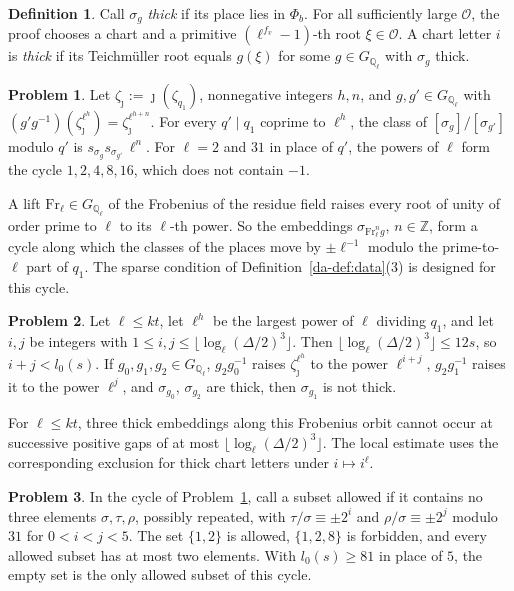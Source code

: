 \documentclass[reqno]{amsart}
\theoremstyle{definition}
\newtheorem{problem}{Problem}[section]
\newtheorem{definition}{Definition}[section]
\theoremstyle{plain}
\newcommand{\Z}{\mathbb{Z}}
\newcommand{\Q}{\mathbb{Q}}
\newcommand{\Oc}{\mathcal{O}}
\newcommand{\Gl}{G_{\Q_\ell}}
\newcommand{\half}{(\Delta/2)}
\begin{document}
\begin{definition}\label{def:thick}
Call \(\sigma_g\) \emph{thick} if its place lies in \(\Phi_b\).  For all sufficiently large \(\Oc\), the proof chooses a chart and a primitive \((\ell^{f_v}-1)\)-th root \(\xi\in\Oc\).  A chart letter \(i\) is \emph{thick} if its Teichmüller root equals \(g(\xi)\) for some \(g\in\Gl\) with \(\sigma_g\) thick.
\end{definition}

\begin{problem}\label{pr:cycle}
Let \(\zeta_\jmath := \jmath(\zeta_{q_1})\), nonnegative integers \(h,n\), and \(g, g' \in \Gl\) with \((g'g^{-1})(\zeta_\jmath^{\ell^h}) = \zeta_\jmath^{\ell^{h+n}}\).  For every \(q' \mid q_1\) coprime to \(\ell^h\), the class of \([\sigma_g]/[\sigma_{g'}]\) modulo \(q'\) is \(s_{\sigma_g}s_{\sigma_{g'}}\,\ell^n\).  For \(\ell = 2\) and \(31\) in place of \(q'\), the powers of \(\ell\) form the cycle \(1, 2, 4, 8, 16\), which does not contain \(-1\).
\end{problem}

A lift \(\mathrm{Fr}_\ell \in \Gl\) of the Frobenius of the residue field raises every root of unity of order prime to \(\ell\) to its \(\ell\)-th power.  So the embeddings \(\sigma_{\mathrm{Fr}_\ell^ng}\), \(n \in \Z\), form a cycle along which the classes of the places move by \(\pm\ell^{-1}\) modulo the prime-to-\(\ell\) part of \(q_1\).  The sparse condition of Definition~\ref{da-def:data}(3) is designed for this cycle.

\begin{problem}\label{pr:sparse-window}
Let \(\ell \le kt\), let \(\ell^h\) be the largest power of \(\ell\) dividing \(q_1\), and let \(i,j\) be integers with \(1 \le i, j \le \lfloor \log_\ell \half^3\rfloor\).  Then \(\lfloor\log_\ell\half^3\rfloor \le 12s\), so \(i + j < l_0(s)\).  If \(g_0, g_1, g_2 \in \Gl\), \(g_2g_0^{-1}\) raises \(\zeta_\jmath^{\ell^h}\) to the power \(\ell^{i+j}\), \(g_2g_1^{-1}\) raises it to the power \(\ell^j\), and \(\sigma_{g_0}\), \(\sigma_{g_2}\) are thick, then \(\sigma_{g_1}\) is not thick.
\end{problem}

For \(\ell\le kt\), three thick embeddings along this Frobenius orbit cannot occur at successive positive gaps of at most \(\lfloor\log_\ell\half^3\rfloor\).  The local estimate uses the corresponding exclusion for thick chart letters under \(i\mapsto i^\ell\).

\begin{problem}\label{pr:toy-window}
In the cycle of Problem~\ref{pr:cycle}, call a subset allowed if it contains no three elements \(\sigma,\tau,\rho\), possibly repeated, with \(\tau/\sigma\equiv\pm2^i\) and \(\rho/\sigma\equiv\pm2^j\) modulo \(31\) for \(0<i<j<5\).  The set \(\{1,2\}\) is allowed, \(\{1,2,8\}\) is forbidden, and every allowed subset has at most two elements.  With \(l_0(s)\ge81\) in place of \(5\), the empty set is the only allowed subset of this cycle.
\end{problem}
\end{document}
